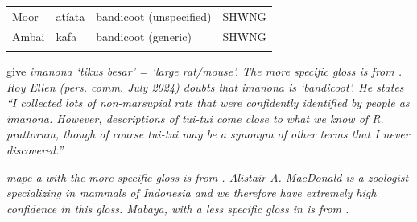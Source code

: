 \begin{table}[p]
\begin{threeparttable}
\begin{tabular}{l|lll}
Moor	&	atíata	&	bandicoot (unspecified)	&	SHWNG	\\
Ambai	&	kafa	&	bandicoot (generic)	&	SHWNG	\\
\lspbottomrule
	\end{tabular}
		\begin{tablenotes}\tnsize
			\item[†]	{\citet{MatokeBolton2005} give \it{imanona} ‘tikus besar’ = ‘large rat/mouse’.
								The more specific gloss is from \citet{Bolton-Grimes1990}.
								Roy Ellen (pers. comm. July 2024) doubts that \it{imanona} is
								`bandicoot'. He states ``I collected lots of non-marsupial rats that were
								confidently identified by people as \it{imanona}.
								However, descriptions of \it{tui-tui} come close to what we know of \it{R.
								prattorum}, though of course \it{tui-tui} may be a synonym of other
								terms that I never discovered.''}
			\item[‡]	{\it{mape-a} with the more specific gloss is from \citet{MacDonald2015}. Alistair A.
								MacDonald is a zoologist specializing in mammals of Indonesia
								and we therefore have extremely high confidence in this gloss.
								\it{Mabaya}, with a less specific gloss in \citet[268]{Schapper2011}
								is from \citet{Flannery1995}.}
		\end{tablenotes}
	\end{threeparttable}
\end{table}